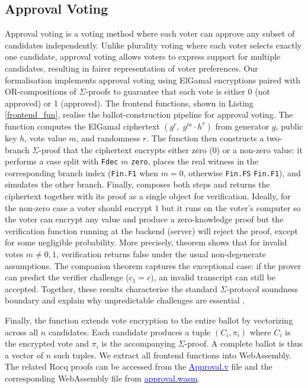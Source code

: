 \documentclass[sigconf, anonymous]{acmart}
\begin{document}
\subsection{Approval Voting}
Approval voting is a voting method where each voter can approve any subset of candidates independently. 
Unlike plurality voting where each voter selects exactly one candidate, approval voting allows voters to express 
support for multiple candidates, resulting in fairer representation of voter preferences. Our formalisation 
implements approval voting using ElGamal encryptions paired with OR-compositions of $\Sigma$-proofs to guarantee that 
each vote is either 0 (not approved) or 1 (approved).  The frontend functions, shown in Listing \ref{frontend_fun}, realise the ballot-construction pipeline for approval voting. The function \texttt{} computes the ElGamal ciphertext $(g^r,\; g^m \cdot h^r)$ from generator $g$, public key $h$, vote value $m$, and randomness $r$. The function \texttt{} then constructs a two-branch $\Sigma$-proof that the ciphertext encrypts either zero ($0$) or a non-zero value: it performs a case split with \texttt{Fdec} $m$ \texttt{zero}, places the real witness in the corresponding branch index (\texttt{Fin.F1} when $m=0$, otherwise \texttt{Fin.FS} \texttt{Fin.F1}), and simulates the other branch. Finally, \texttt{} composes both steps and returns the ciphertext together with its proof as a single object for verification. Ideally, for the non-zero case a voter should encrypt $1$ but it runs on the voter's computer so the voter can encrypt any value and produce a zero-knowledge proof but the verification function running at the backend (server) will reject the proof, except for some negligible probability. More precisely, theorem \texttt{} shows that for invalid votes $m \neq 0,1$, verification returns false under the usual non-degenerate assumptions. The companion theorem \texttt{} captures the exceptional case: if the prover can predict the verifier challenge ($c_1 = c$), an invalid transcript can still be accepted. Together, these results characterise the standard $\Sigma$-protocol soundness boundary and explain why unpredictable challenges are essential \cite{10.1007/978-3-642-34961-4_38,dao2023weak}. 

Finally, the function \texttt{} extends vote encryption to the entire ballot by vectorizing across all $n$ candidates. Each candidate 
produces a tuple $(C_i, \pi_i)$ where $C_i$ is the encrypted vote and $\pi_i$ is the accompanying $\Sigma$-proof. A complete ballot is thus a vector of $n$ such tuples. We extract all frontend functions into WebAssembly. The related Rocq proofs can be accessed from the \href{https://anonymous.4open.science/r/SigmaProtocol-EBA5/src/Frontend/Approval.v}{\textcolor{blue}{Approval.v}} file and the corresponding WebAssembly file from \href{https://anonymous.4open.science/r/SigmaProtocol-EBA5/src/Wasm/approval.wasm}{\textcolor{blue}{approval.wasm}}.
\end{document}
